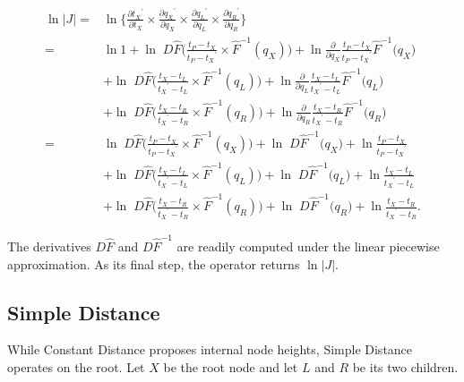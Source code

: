 \documentclass[12pt]{article}
\begin{document}
\begin{align}
	\ln |J| =&  \ln \{ \frac{\partial {t_X}^\prime}{\partial t_X} \times \frac{\partial {q_X}^\prime}{\partial q_X} \times \frac{\partial {q_L}^\prime}{\partial q_L} \times \frac{\partial {q_R}^\prime}{\partial q_R} \} \nonumber\\
		=& \ln 1 + \ln \; D \hat{F}\Big( \frac{t_P - t_X}{t_P - {t_X}^\prime} \times \hat{F}^{-1}(q_X)  \Big) + \ln \frac{\partial}{\partial q_X}  \frac{t_P - t_X}{t_P - {t_X}^\prime} \hat{F}^{-1} \Big( q_X \Big) \nonumber\\
		& + \ln \; D\hat{F}\Big( \frac{t_X - t_L}{{t_X}^\prime - t_L} \times \hat{F}^{-1}(q_L) \Big) + \ln \frac{\partial}{\partial q_L} \frac{t_X - t_L}{{t_X}^\prime - t_L} \hat{F}^{-1} \Big( q_L \Big) \nonumber\\
		& + \ln \; D \hat{F}\Big( \frac{t_X - t_R}{{t_X}^\prime - t_R} \times \hat{F}^{-1}(q_R) \Big) + \ln \frac{\partial}{\partial q_R} \frac{t_X - t_R}{{t_X}^\prime - t_R} \hat{F}^{-1} \Big( q_R \Big) \nonumber\\
		=& \ln \; D \hat{F}\Big( \frac{t_P - t_X}{t_P - {t_X}^\prime} \times \hat{F}^{-1}(q_X)  \Big) + \ln \; D  \hat{F}^{-1} \Big( q_X \Big) + \ln \frac{t_P - t_X}{t_P - {t_X}^\prime} \nonumber\\
		& + \ln \; D\hat{F}\Big( \frac{t_X - t_L}{{t_X}^\prime - t_L} \times \hat{F}^{-1}(q_L) \Big) + \ln \; D \hat{F}^{-1} \Big( q_L \Big) + \ln  \frac{t_X - t_L}{{t_X}^\prime - t_L} \nonumber \\
		& + \ln \; D \hat{F}\Big( \frac{t_X - t_R}{{t_X}^\prime - t_R} \times \hat{F}^{-1}(q_R) \Big) + \ln \; D\hat{F}^{-1} \Big( q_R \Big) + \ln \frac{t_X - t_R}{{t_X}^\prime - t_R} .
\end{align}







The derivatives $D\hat{F}$ and $D\hat{F}^{-1}$ are readily computed under the linear piecewise approximation. As its final step, the operator returns $\ln |J|$. 




\subsection{Simple Distance}

While Constant Distance proposes internal node heights, Simple Distance operates on the root. Let $X$ be the root node and let $L$ and $R$ be its two children.
\end{document}
